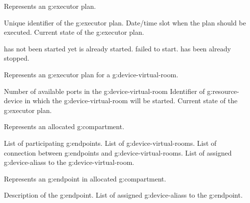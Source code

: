 \begin{Api}
Represents an \gls{g:executor} plan.
\begin{ApiClassAttributes}
 Unique identifier of the \gls{g:executor} plan.
 Date/time slot when the plan should be executed.
 Current state of the \gls{g:executor} plan.
\end{ApiClassAttributes}

\begin{ApiEnumValues}
  has not been started yet
  is already started.
  failed to start.
  has been already stopped.
\end{ApiEnumValues}

Represents an \gls{g:executor} plan for a \gls{g:device-virtual-room}.
\begin{ApiClassAttributes}
 Number of available ports in the \gls{g:device-virtual-room}
 Identifier of \gls{g:resource-device} in which the \gls{g:device-virtual-room} will be started.
 Current state of the \gls{g:executor} plan.
\end{ApiClassAttributes}

Represents an allocated \gls{g:compartment}.
\begin{ApiClassAttributes}
 List of participating \glspl{g:endpoint}.
 List of \glspl{g:device-virtual-room}.
 List of connection between \glspl{g:endpoint} and \glspl{g:device-virtual-room}.
 List of assigned \glspl{g:device-alias} to the \gls{g:device-virtual-room}.
\end{ApiClassAttributes}

Represents an \gls{g:endpoint} in allocated \gls{g:compartment}.
\begin{ApiClassAttributes}
 Description of the \gls{g:endpoint}.
 List of assigned \glspl{g:device-alias} to the \gls{g:endpoint}.
\end{ApiClassAttributes}


\end{Api}
